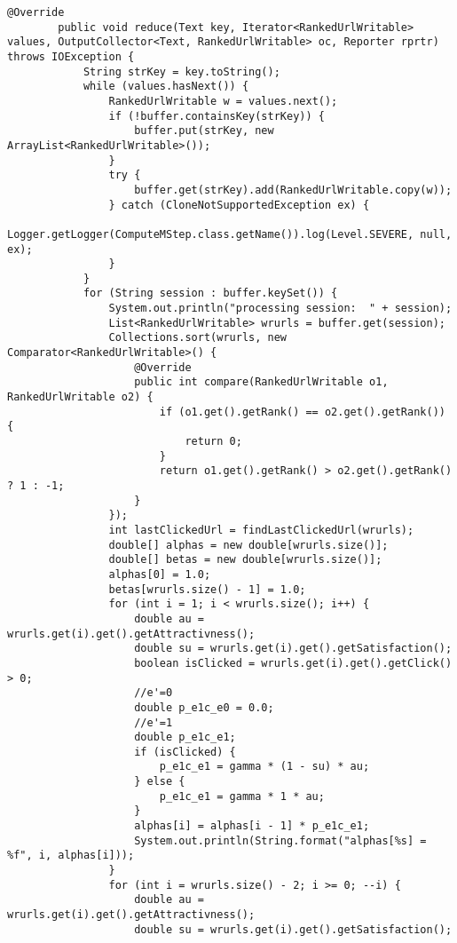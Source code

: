 \begin{lstlisting}[style=java,caption=Dynamic Bayes Network. M step]
        @Override
        public void reduce(Text key, Iterator<RankedUrlWritable> values, OutputCollector<Text, RankedUrlWritable> oc, Reporter rprtr) throws IOException {
            String strKey = key.toString();
            while (values.hasNext()) {
                RankedUrlWritable w = values.next();
                if (!buffer.containsKey(strKey)) {
                    buffer.put(strKey, new ArrayList<RankedUrlWritable>());
                }
                try {
                    buffer.get(strKey).add(RankedUrlWritable.copy(w));
                } catch (CloneNotSupportedException ex) {
                    Logger.getLogger(ComputeMStep.class.getName()).log(Level.SEVERE, null, ex);
                }
            }
            for (String session : buffer.keySet()) {
                System.out.println("processing session:  " + session);
                List<RankedUrlWritable> wrurls = buffer.get(session);
                Collections.sort(wrurls, new Comparator<RankedUrlWritable>() {
                    @Override
                    public int compare(RankedUrlWritable o1, RankedUrlWritable o2) {
                        if (o1.get().getRank() == o2.get().getRank()) {
                            return 0;
                        }
                        return o1.get().getRank() > o2.get().getRank() ? 1 : -1;
                    }
                });
                int lastClickedUrl = findLastClickedUrl(wrurls);
                double[] alphas = new double[wrurls.size()];
                double[] betas = new double[wrurls.size()];
                alphas[0] = 1.0;
                betas[wrurls.size() - 1] = 1.0;
                for (int i = 1; i < wrurls.size(); i++) {
                    double au = wrurls.get(i).get().getAttractivness();
                    double su = wrurls.get(i).get().getSatisfaction();
                    boolean isClicked = wrurls.get(i).get().getClick() > 0;
                    //e'=0
                    double p_e1c_e0 = 0.0;
                    //e'=1
                    double p_e1c_e1;
                    if (isClicked) {
                        p_e1c_e1 = gamma * (1 - su) * au;
                    } else {
                        p_e1c_e1 = gamma * 1 * au;
                    }
                    alphas[i] = alphas[i - 1] * p_e1c_e1;
                    System.out.println(String.format("alphas[%s] = %f", i, alphas[i]));
                }
                for (int i = wrurls.size() - 2; i >= 0; --i) {
                    double au = wrurls.get(i).get().getAttractivness();
                    double su = wrurls.get(i).get().getSatisfaction();

\end{lstlisting}
